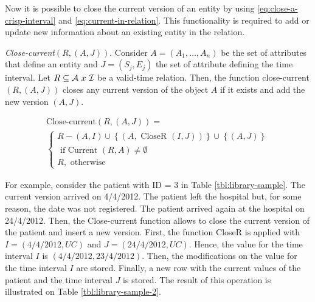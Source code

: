 Now it is possible to close the current version of an entity by using \eqref{eq:close-a-crisp-interval} and \eqref{eq:current-in-relation}. This functionality is required to add or update new information about an existing entity in the relation.

\begin{definition}
\label{def:close-current-version}
\emph{Close-current$\left(R, \left(A, J  \right)\right)$}.
Consider $A=\left(A_1, \ldots, A_n \right)$ be the set of attributes that define an entity and $J = \left(S_j,E_j \right)$ the set of attribute defining the time interval. Let $R \subseteq \mathcal{A}\  x\  \mathcal{I}$ be a valid-time relation. Then, the function close-current$\left(R,\left(A,J\right) \right)$ closes any current version of the object $A$ if it exists and add the new version $\left(A, J\right)$.

\begin{eqnarray}
\label{eq:close-current}
\text{Close-current} \left(R, \left(A, J\right) \right) =\\
\begin{cases}
\nonumber
R - \left(A, I \right) \cup \left \lbrace \left(A, \mbox{ CloseR } \left(I, J\right) \right)\right \rbrace \cup \left \lbrace\left(A, J\right) \right \rbrace  \\
\nonumber
\mbox{ if  Current } \left(R, A \right) \neq \emptyset\\ %
\nonumber R , \text{ otherwise}
\end{cases}
\end{eqnarray}
\end{definition}

For example, consider the patient with ID = 3 in Table \ref{tbl:library-sample}. The current version arrived on 4/4/2012. The patient left the hospital but, for some reason, the date  was not registered. The patient arrived again at the hospital on 24/4/2012. Then, the Close-current function allows to close the current version of the patient and insert a new version. First, the function CloseR is applied with $I = \left(4/4/2012, UC \right)$ and $J = \left(24/4/2012, UC \right)$. Hence, the value for the time interval $I$ is $ \left(4/4/2012, 23/4/2012 \right)$. Then, the modifications on the value for the time interval $I$ are stored. Finally, a new row with the current values of the patient and the time interval $J$ is stored.
The result of this operation is illustrated on Table \ref{tbl:library-sample-2}.




